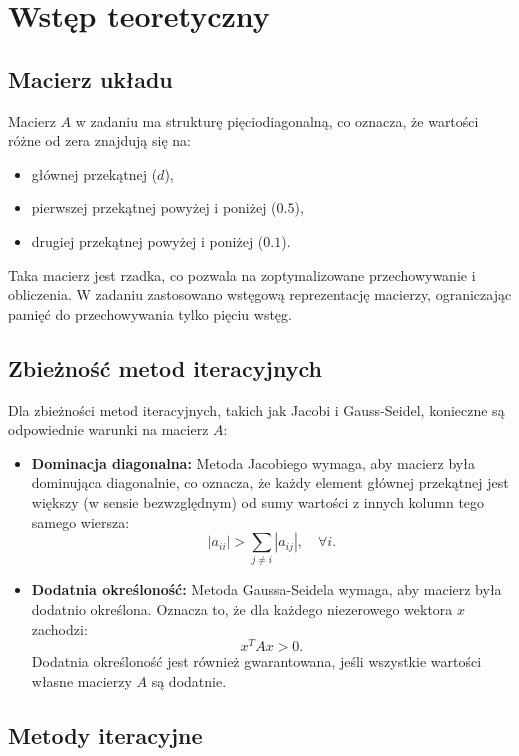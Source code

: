 \documentclass[a4paper,12pt]{article}
\begin{document}
\section{Wstęp teoretyczny}

\subsection{Macierz układu}

Macierz \(A\) w zadaniu ma strukturę pięciodiagonalną, co oznacza, że wartości różne od zera znajdują się na:
\begin{itemize}
    \item głównej przekątnej (\(d\)),
    \item pierwszej przekątnej powyżej i poniżej (\(0.5\)),
    \item drugiej przekątnej powyżej i poniżej (\(0.1\)).
\end{itemize}

Taka macierz jest rzadka, co pozwala na zoptymalizowane przechowywanie i obliczenia. W zadaniu zastosowano wstęgową reprezentację macierzy, ograniczając pamięć do przechowywania tylko pięciu wstęg.

\subsection{Zbieżność metod iteracyjnych}

Dla zbieżności metod iteracyjnych, takich jak Jacobi i Gauss-Seidel, konieczne są odpowiednie warunki na macierz \(A\):
\begin{itemize}
    \item \textbf{Dominacja diagonalna:} Metoda Jacobiego wymaga, aby macierz była dominująca diagonalnie, co oznacza, że każdy element głównej przekątnej jest większy (w sensie bezwzględnym) od sumy wartości z innych kolumn tego samego wiersza:
    \[
    |a_{ii}| > \sum_{j \neq i} |a_{ij}|, \quad \forall i.
    \]
    \item \textbf{Dodatnia określoność:} Metoda Gaussa-Seidela wymaga, aby macierz była dodatnio określona. Oznacza to, że dla każdego niezerowego wektora \(x\) zachodzi:
    \[
    x^T A x > 0.
    \]
    Dodatnia określoność jest również gwarantowana, jeśli wszystkie wartości własne macierzy \(A\) są dodatnie.
\end{itemize}

\subsection{Metody iteracyjne}
\end{document}

